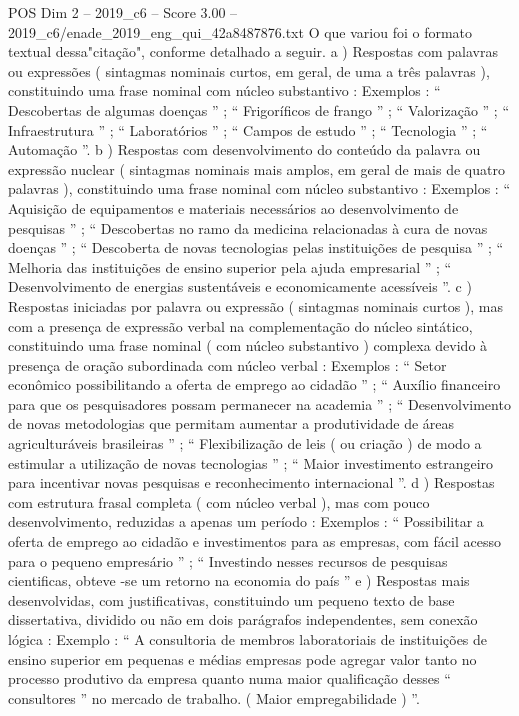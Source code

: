 \begin{textsample}{POS Dim 2 – 2019\_c6 – Score 3.00 – 2019\_c6/enade\_2019\_eng\_qui\_42a8487876.txt}
O que variou foi o formato textual dessa"citação", conforme detalhado a seguir. a ) Respostas com palavras ou expressões ( sintagmas nominais curtos, em geral, de uma a três palavras ), constituindo uma frase nominal com núcleo substantivo : Exemplos : “ Descobertas de algumas doenças ” ; “ Frigoríficos de frango ” ; “ Valorização ” ; “ Infraestrutura ” ; “ Laboratórios ” ; “ Campos de estudo ” ; “ Tecnologia ” ; “ Automação ”. b ) Respostas com desenvolvimento do conteúdo da palavra ou expressão nuclear ( sintagmas nominais mais amplos, em geral de mais de quatro palavras ), constituindo uma frase nominal com núcleo substantivo : Exemplos : “ Aquisição de equipamentos e materiais necessários ao desenvolvimento de pesquisas ” ; “ Descobertas no ramo da medicina relacionadas à cura de novas doenças ” ; “ Descoberta de novas tecnologias pelas instituições de pesquisa ” ; “ Melhoria das instituições de ensino superior pela ajuda empresarial ” ; “ Desenvolvimento de energias sustentáveis e economicamente acessíveis ”. c ) Respostas iniciadas por palavra ou expressão ( sintagmas nominais curtos ), mas com a presença de expressão verbal na complementação do núcleo sintático, constituindo uma frase nominal ( com núcleo substantivo ) complexa devido à presença de oração subordinada com núcleo verbal : Exemplos : “ Setor econômico possibilitando a oferta de emprego ao cidadão ” ; “ Auxílio financeiro para que os pesquisadores possam permanecer na academia ” ; “ Desenvolvimento de novas metodologias que permitam aumentar a produtividade de áreas agriculturáveis brasileiras ” ; “ Flexibilização de leis ( ou criação ) de modo a estimular a utilização de novas tecnologias ” ; “ Maior investimento estrangeiro para incentivar novas pesquisas e reconhecimento internacional ”. d ) Respostas com estrutura frasal completa ( com núcleo verbal ), mas com pouco desenvolvimento, reduzidas a apenas um período : Exemplos : “ Possibilitar a oferta de emprego ao cidadão e investimentos para as empresas, com fácil acesso para o pequeno empresário ” ; “ Investindo nesses recursos de pesquisas cientificas, obteve -se um retorno na economia do país ” e ) Respostas mais desenvolvidas, com justificativas, constituindo um pequeno texto de base dissertativa, dividido ou não em dois parágrafos independentes, sem conexão lógica : Exemplo : “ A consultoria de membros laboratoriais de instituições de ensino superior em pequenas e médias empresas pode agregar valor tanto no processo produtivo da empresa quanto numa maior qualificação desses “ consultores ” no mercado de trabalho. ( Maior empregabilidade ) ”.

\end{textsample}
